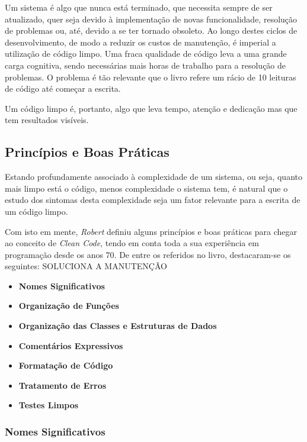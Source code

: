 \documentclass[10pt,portuguese]{article}
\begin{document}
\par Um sistema é algo que nunca está terminado, que necessita sempre de ser atualizado, quer seja devido à implementação de novas funcionalidade, resolução de problemas ou, até, devido a se ter tornado obsoleto. Ao longo destes ciclos de desenvolvimento, de modo a reduzir os custos de manutenção, é imperial a utilização de código limpo. Uma fraca qualidade de código leva a uma grande carga cognitiva, sendo necessárias mais horas de trabalho para a resolução de problemas. O problema 
é tão relevante que o livro refere um rácio de 10 leituras de código até começar a escrita.

\par Um código limpo é, portanto, algo que leva tempo, atenção e dedicação mas que tem resultados visíveis.

\subsection{Princípios e Boas Práticas}

\par Estando profundamente associado à complexidade de um sistema, ou seja, quanto mais limpo está o código, menos complexidade o sistema tem, é natural que o estudo dos sintomas desta complexidade seja um fator relevante para a escrita de um código limpo. 

\par Com isto em mente, \textit{Robert} definiu alguns princípios e boas práticas para chegar ao conceito de \textit{Clean Code}, tendo em conta toda a sua experiência em programação desde os anos 70.  De entre os referidos no livro, destacaram-se os seguintes:
SOLUCIONA A MANUTENÇÃO
\begin{itemize}
    \item \textbf{Nomes Significativos}
    \item \textbf{Organização de Funções}
    \item \textbf{Organização das Classes e Estruturas de Dados}
    \item \textbf{Comentários Expressivos}
    \item \textbf{Formatação de Código}
    \item \textbf{Tratamento de Erros}
    \item \textbf{Testes Limpos}
\end{itemize}

\subsubsection{Nomes Significativos}
\end{document}

